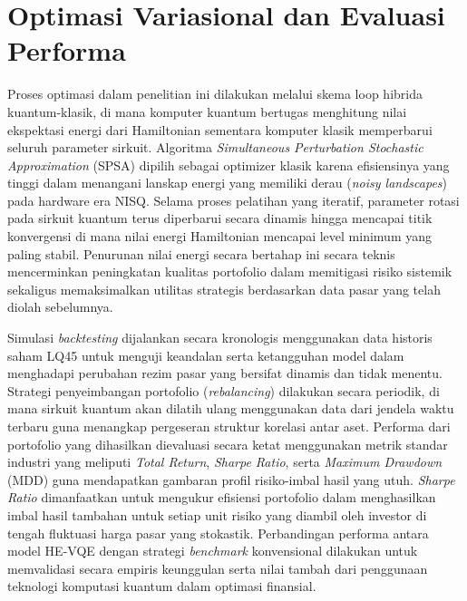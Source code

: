 \section{Optimasi Variasional dan Evaluasi Performa}
Proses optimasi dalam penelitian ini dilakukan melalui skema loop hibrida kuantum-klasik, di mana komputer kuantum bertugas menghitung nilai ekspektasi energi dari Hamiltonian sementara komputer klasik memperbarui seluruh parameter sirkuit. Algoritma \textit{Simultaneous Perturbation Stochastic Approximation} (SPSA) dipilih sebagai optimizer klasik karena efisiensinya yang tinggi dalam menangani lanskap energi yang memiliki derau (\textit{noisy landscapes}) pada hardware era NISQ. Selama proses pelatihan yang iteratif, parameter rotasi pada sirkuit kuantum terus diperbarui secara dinamis hingga mencapai titik konvergensi di mana nilai energi Hamiltonian mencapai level minimum yang paling stabil. Penurunan nilai energi secara bertahap ini secara teknis mencerminkan peningkatan kualitas portofolio dalam memitigasi risiko sistemik sekaligus memaksimalkan utilitas strategis berdasarkan data pasar yang telah diolah sebelumnya.

Simulasi \textit{backtesting} dijalankan secara kronologis menggunakan data historis saham LQ45 untuk menguji keandalan serta ketangguhan model dalam menghadapi perubahan rezim pasar yang bersifat dinamis dan tidak menentu. Strategi penyeimbangan portofolio (\textit{rebalancing}) dilakukan secara periodik, di mana sirkuit kuantum akan dilatih ulang menggunakan data dari jendela waktu terbaru guna menangkap pergeseran struktur korelasi antar aset. Performa dari portofolio yang dihasilkan dievaluasi secara ketat menggunakan metrik standar industri yang meliputi \textit{Total Return}, \textit{Sharpe Ratio}, serta \textit{Maximum Drawdown} (MDD) guna mendapatkan gambaran profil risiko-imbal hasil yang utuh. \textit{Sharpe Ratio} dimanfaatkan untuk mengukur efisiensi portofolio dalam menghasilkan imbal hasil tambahan untuk setiap unit risiko yang diambil oleh investor di tengah fluktuasi harga pasar yang stokastik. Perbandingan performa antara model HE-VQE dengan strategi \textit{benchmark} konvensional dilakukan untuk memvalidasi secara empiris keunggulan serta nilai tambah dari penggunaan teknologi komputasi kuantum dalam optimasi finansial.
